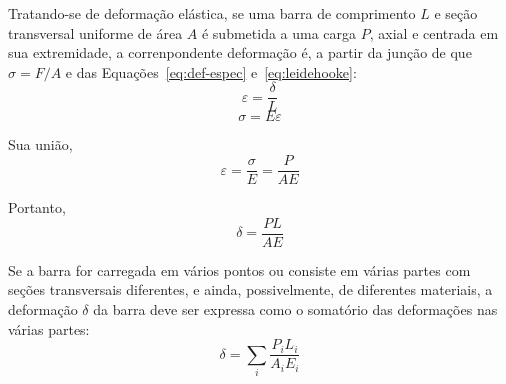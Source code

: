 Tratando-se de deformação elástica, se uma barra de comprimento $L$ e seção transversal uniforme de área $A$ é submetida a uma carga $P$, axial e centrada em sua extremidade, a correnpondente deformação é, a partir da junção de que $\sigma=F/A$ e das Equações~\eqref{eq:def-espec} e~\eqref{eq:leidehooke}:
$$\varepsilon=\frac{\delta}{L}$$
$$\sigma=E\varepsilon$$

Sua união,
$$\varepsilon=\frac{\sigma}{E}=\frac{P}{AE}$$

Portanto,
\begin{equation}\label{eq:def-elastica}
	\delta=\frac{PL}{AE}
\end{equation}

Se a barra for carregada em vários pontos ou consiste em várias partes com seções transversais diferentes, e ainda, possivelmente, de diferentes materiais, a deformação $\delta$ da barra deve ser expressa como o somatório das deformações nas várias partes:
\begin{equation}
	\delta=\sum_i\frac{P_iL_i}{A_iE_i}
\end{equation}